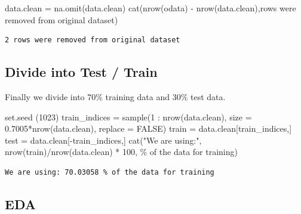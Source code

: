 \documentclass[
  letterpaper,
  DIV=11,
  numbers=noendperiod]{scrartcl}
\newenvironment{Shaded}{\begin{snugshade}}{\end{snugshade}}
\newcommand{\AttributeTok}[1]{\textcolor[rgb]{0.40,0.45,0.13}{#1}}
\newcommand{\ConstantTok}[1]{\textcolor[rgb]{0.56,0.35,0.01}{#1}}
\newcommand{\DecValTok}[1]{\textcolor[rgb]{0.68,0.00,0.00}{#1}}
\newcommand{\FloatTok}[1]{\textcolor[rgb]{0.68,0.00,0.00}{#1}}
\newcommand{\FunctionTok}[1]{\textcolor[rgb]{0.28,0.35,0.67}{#1}}
\newcommand{\NormalTok}[1]{\textcolor[rgb]{0.00,0.23,0.31}{#1}}
\newcommand{\OtherTok}[1]{\textcolor[rgb]{0.00,0.23,0.31}{#1}}
\newcommand{\SpecialCharTok}[1]{\textcolor[rgb]{0.37,0.37,0.37}{#1}}
\newcommand{\StringTok}[1]{\textcolor[rgb]{0.13,0.47,0.30}{#1}}
\begin{document}
\begin{Shaded}
\begin{Highlighting}[]
\NormalTok{data.clean }\OtherTok{=} \FunctionTok{na.omit}\NormalTok{(data.clean)}
\FunctionTok{cat}\NormalTok{(}\FunctionTok{nrow}\NormalTok{(odata) }\SpecialCharTok{{-}} \FunctionTok{nrow}\NormalTok{(data.clean),}\StringTok{\textquotesingle{}rows were removed from original dataset\textquotesingle{}}\NormalTok{)}
\end{Highlighting}
\end{Shaded}

\begin{verbatim}
2 rows were removed from original dataset
\end{verbatim}

\subsection{Divide into Test / Train}\label{divide-into-test-train}

Finally we divide into 70\% training data and 30\% test data.

\begin{Shaded}
\begin{Highlighting}[]
\FunctionTok{set.seed}\NormalTok{ (}\DecValTok{1023}\NormalTok{)}
\NormalTok{train\_indices }\OtherTok{=} \FunctionTok{sample}\NormalTok{(}\DecValTok{1} \SpecialCharTok{:} \FunctionTok{nrow}\NormalTok{(data.clean), }\AttributeTok{size =} \FloatTok{0.7005}\SpecialCharTok{*}\FunctionTok{nrow}\NormalTok{(data.clean), }\AttributeTok{replace =} \ConstantTok{FALSE}\NormalTok{)}
\NormalTok{train }\OtherTok{=}\NormalTok{ data.clean[train\_indices,]}
\NormalTok{test }\OtherTok{=}\NormalTok{ data.clean[}\SpecialCharTok{{-}}\NormalTok{train\_indices,]}
\FunctionTok{cat}\NormalTok{(}\StringTok{"We are using:"}\NormalTok{, }\FunctionTok{nrow}\NormalTok{(train)}\SpecialCharTok{/}\FunctionTok{nrow}\NormalTok{(data.clean) }\SpecialCharTok{*} \DecValTok{100}\NormalTok{, }\StringTok{\textquotesingle{}\% of the data for training\textquotesingle{}}\NormalTok{)}
\end{Highlighting}
\end{Shaded}

\begin{verbatim}
We are using: 70.03058 % of the data for training
\end{verbatim}

\subsection{EDA}\label{eda}
\end{document}
